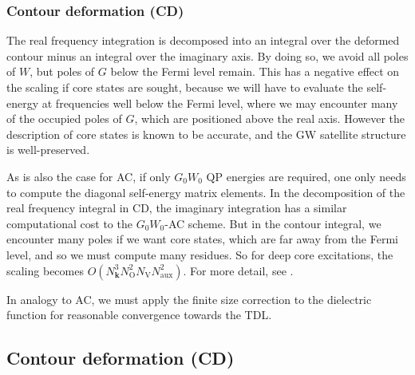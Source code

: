 \subsubsection{Contour deformation (CD)}
The real frequency integration is decomposed into an integral over the deformed contour minus an integral over the imaginary axis. By doing so, we avoid all poles of $W$, but poles of $G$ below the Fermi level remain. This has a negative effect on the scaling if core states are sought, because we will have to evaluate the self-energy at frequencies well below the Fermi level, where we may encounter many of the occupied poles of $G$, which are positioned above the real axis. However the description of core states is known to be accurate, and the GW satellite structure is well-preserved.
\begin{tcolorbox}[colback=blue!5!white,colframe=blue!75!black,title=Scaling analysis for extended systems]
As is also the case for AC, if only $G_0 W_0$ QP energies are required, one only needs to compute the diagonal self-energy matrix elements. In the decomposition of the real frequency integral in CD, the imaginary integration has a similar computational cost to the $G_0 W_0$-AC scheme. But in the contour integral, we encounter many poles if we want core states, which are far away from the Fermi level, and so we must compute many residues. So for deep core excitations, the scaling becomes $O\left(N_{\bm{k}}^3 N_{\mathrm{O}}^2 N_{\mathrm{V}} N_{\mathrm{aux}}^2\right)$. For more detail, see \cite{Zhu2020-nt}.
\end{tcolorbox}
In analogy to AC, we must apply the finite size correction to the dielectric function for reasonable convergence towards the TDL.
\subsection{Contour deformation (CD)}
